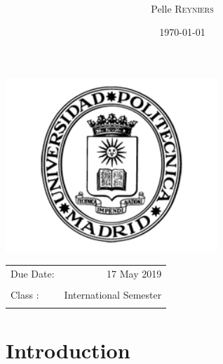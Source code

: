 \documentclass[twoside,a4paper]{article}
\title{\maintitle \\ \course \\{\small\ \coursenumber}} %
\author{Pelle \textsc{Reyniers} \\ } %
\date{\today} %
\newcommand{\class}{International Semester}
\begin{document}
    \sloppy %
    \begin{titlepage}
    \maketitle %
    
    \vfill
    \begin{center}
    \includegraphics[width=0.6\textwidth]{upm_logo.png} %
    \end{center}
    \vfill
    \vfill
    \vfill
    
    \begin{center}
    \begin{tabular}{l r}
    Due Date: & 17 May 2019 \\ %
    \\
    Class : & \class \\
    \\
    \end{tabular}
    \end{center}
    \vfill
    \vfill
    \end{titlepage}
    \clearpage
    
    
    
    \section*{Introduction}
    
    
\end{document}
